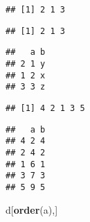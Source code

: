 \documentclass[
]{article}
\newenvironment{Shaded}{\begin{snugshade}}{\end{snugshade}}
\newcommand{\DataTypeTok}[1]{\textcolor[rgb]{0.13,0.29,0.53}{#1}}
\newcommand{\DecValTok}[1]{\textcolor[rgb]{0.00,0.00,0.81}{#1}}
\newcommand{\KeywordTok}[1]{\textcolor[rgb]{0.13,0.29,0.53}{\textbf{#1}}}
\newcommand{\NormalTok}[1]{#1}
\newcommand{\OperatorTok}[1]{\textcolor[rgb]{0.81,0.36,0.00}{\textbf{#1}}}
\newcommand{\StringTok}[1]{\textcolor[rgb]{0.31,0.60,0.02}{#1}}
\begin{document}
\begin{verbatim}
## [1] 2 1 3
\end{verbatim}

\begin{Shaded}
\end{Shaded}

\begin{verbatim}
## [1] 2 1 3
\end{verbatim}

\begin{Shaded}
\end{Shaded}

\begin{verbatim}
##   a b
## 2 1 y
## 1 2 x
## 3 3 z
\end{verbatim}

\begin{Shaded}
\end{Shaded}

\begin{verbatim}
## [1] 4 2 1 3 5
\end{verbatim}

\begin{Shaded}
\end{Shaded}

\begin{verbatim}
##   a b
## 4 2 4
## 2 4 2
## 1 6 1
## 3 7 3
## 5 9 5
\end{verbatim}

\begin{Shaded}
\begin{Highlighting}[]
\NormalTok{d[}\KeywordTok{order}\NormalTok{(a),]}
\end{Highlighting}
\end{Shaded}
\end{document}
